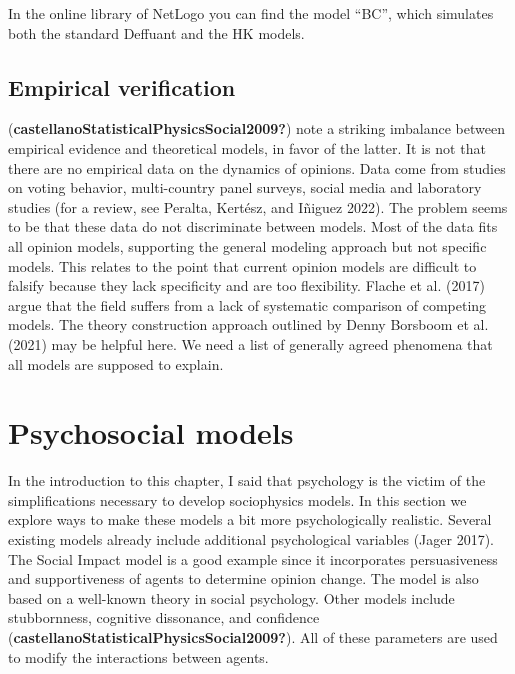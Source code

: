 \documentclass[
  letterpaper,
]{scrbook}
\begin{document}
In the online library of NetLogo you can find the model ``BC'', which
simulates both the standard Deffuant and the HK models.

\hypertarget{empirical-verification}{%
\subsection{Empirical verification}\label{empirical-verification}}

(\textbf{castellanoStatisticalPhysicsSocial2009?}) note a striking
imbalance between empirical evidence and theoretical models, in favor of
the latter. It is not that there are no empirical data on the dynamics
of opinions. Data come from studies on voting behavior, multi-country
panel surveys, social media and laboratory studies (for a review, see
Peralta, Kertész, and Iñiguez 2022). The problem seems to be that these
data do not discriminate between models. Most of the data fits all
opinion models, supporting the general modeling approach but not
specific models. This relates to the point that current opinion models
are difficult to falsify because they lack specificity and are too
flexibility. Flache et al. (2017) argue that the field suffers from a
lack of systematic comparison of competing models. The theory
construction approach outlined by Denny Borsboom et al. (2021) may be
helpful here. We need a list of generally agreed phenomena that all
models are supposed to explain.

\hypertarget{psychosocial-models}{%
\section{Psychosocial models}\label{psychosocial-models}}

In the introduction to this chapter, I said that psychology is the
victim of the simplifications necessary to develop sociophysics models.
In this section we explore ways to make these models a bit more
psychologically realistic. Several existing models already include
additional psychological variables (Jager 2017). The Social Impact model
is a good example since it incorporates persuasiveness and
supportiveness of agents to determine opinion change. The model is also
based on a well-known theory in social psychology. Other models include
stubbornness, cognitive dissonance, and confidence
(\textbf{castellanoStatisticalPhysicsSocial2009?}). All of these
parameters are used to modify the interactions between agents.
\end{document}
